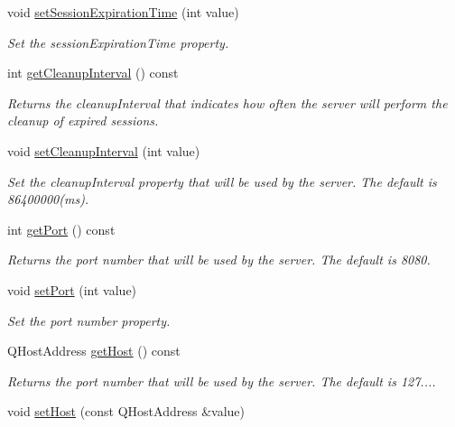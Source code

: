 \begin{DoxyCompactItemize}
void \hyperlink{class_c_w_f_1_1_configuration_ad6b858657acf48a7f3a7788ea2fe58c3}{set\+Session\+Expiration\+Time} (int value)
\begin{DoxyCompactList}\small\item\em Set the session\+Expiration\+Time property. \end{DoxyCompactList}\item 
int \hyperlink{class_c_w_f_1_1_configuration_a2763f705c5284db8a8ed0aad5d239f85}{get\+Cleanup\+Interval} () const 
\begin{DoxyCompactList}\small\item\em Returns the cleanup\+Interval that indicates how often the server will perform the cleanup of expired sessions. \end{DoxyCompactList}\item 
void \hyperlink{class_c_w_f_1_1_configuration_a1cb7a750d000213d724a3960bd309fdb}{set\+Cleanup\+Interval} (int value)
\begin{DoxyCompactList}\small\item\em Set the cleanup\+Interval property that will be used by the server. The default is 86400000(ms). \end{DoxyCompactList}\item 
int \hyperlink{class_c_w_f_1_1_configuration_a2d71629f922ac2725e312d513cf531d0}{get\+Port} () const 
\begin{DoxyCompactList}\small\item\em Returns the port number that will be used by the server. The default is 8080. \end{DoxyCompactList}\item 
void \hyperlink{class_c_w_f_1_1_configuration_a96e8175de6aa562d62aec812d46b8fa1}{set\+Port} (int value)
\begin{DoxyCompactList}\small\item\em Set the port number property. \end{DoxyCompactList}\item 
Q\+Host\+Address \hyperlink{class_c_w_f_1_1_configuration_a4d229f83310649ddd7329a03505e8488}{get\+Host} () const 
\begin{DoxyCompactList}\small\item\em Returns the port number that will be used by the server. The default is 127.... \end{DoxyCompactList}\item 
void \hyperlink{class_c_w_f_1_1_configuration_a5e7e38798ec8de6e6d5507e6eed5672c}{set\+Host} (const Q\+Host\+Address \&value)

\end{DoxyCompactItemize}
